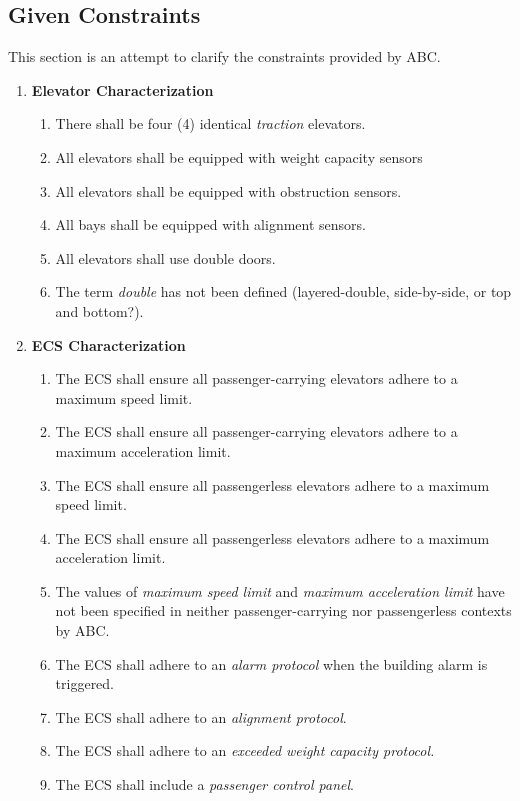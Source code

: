 \documentclass[12pt]{article}
\begin{document}
\subsection{Given Constraints}
This section is an attempt to clarify the constraints provided by ABC.
\begin{enumerate}
\item{\textbf{Elevator Characterization}
\begin{enumerate}
\item There shall be four (4) identical \textit{traction} elevators.
\item All elevators shall be equipped with weight capacity sensors
\item All elevators shall be equipped with obstruction sensors.
\item All bays shall be equipped with alignment sensors.
\item All elevators shall use double doors.
\item The term \textit{double} has not been defined (layered-double, side-by-side, or top and bottom?).
\end{enumerate}}

\item{\textbf{ECS Characterization}
\begin{enumerate}
\item The ECS shall ensure all passenger-carrying elevators adhere to a maximum speed limit.
\item The ECS shall ensure all passenger-carrying elevators adhere to a maximum acceleration limit.
\item The ECS shall ensure all passengerless elevators adhere to a maximum speed limit.
\item The ECS shall ensure all passengerless elevators adhere to a maximum acceleration limit.
\item The values of \textit{maximum speed limit} and \textit{maximum acceleration limit} have not been specified in neither passenger-carrying nor passengerless contexts by ABC.
\item The ECS shall adhere to an \textit{alarm protocol} when the building alarm is triggered.
\item The ECS shall adhere to an \textit{alignment protocol}.
\item The ECS shall adhere to an \textit{exceeded weight capacity protocol.}
\item The ECS shall include a \textit{passenger control panel}.
\end{enumerate}}


\end{enumerate}
\end{document}

